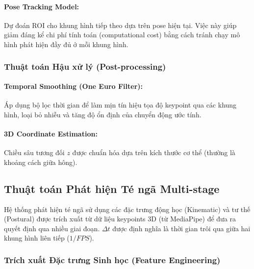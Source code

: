 \paragraph{Pose Tracking Model:} Dự đoán ROI cho khung hình tiếp theo dựa trên pose hiện tại. Việc này giúp giảm đáng kể chi phí tính toán (computational cost) bằng cách tránh chạy mô hình phát hiện đầy đủ ở mỗi khung hình.

\subsubsection{Thuật toán Hậu xử lý (Post-processing)}

\paragraph{Temporal Smoothing (One Euro Filter):} Áp dụng bộ lọc thời gian để làm mịn tín hiệu tọa độ keypoint qua các khung hình, loại bỏ nhiễu và tăng độ ổn định của chuyển động ước tính.

\paragraph{3D Coordinate Estimation:} Chiều sâu tương đối $z$ được chuẩn hóa dựa trên kích thước cơ thể (thường là khoảng cách giữa hông).

\subsection{Thuật toán Phát hiện Té ngã Multi-stage}

Hệ thống phát hiện té ngã sử dụng các đặc trưng động học (Kinematic) và tư thế (Postural) được trích xuất từ dữ liệu keypoints 3D (từ MediaPipe) để đưa ra quyết định qua nhiều giai đoạn. $\Delta t$ được định nghĩa là thời gian trôi qua giữa hai khung hình liên tiếp ($1/FPS$).

\subsubsection{Trích xuất Đặc trưng Sinh học (Feature Engineering)}

